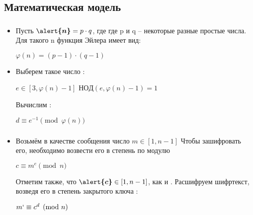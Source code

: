 \documentclass[t]{beamer}
\begin{document}
\subsection{Математическая модель}

\begin{frame}
	\frametitle{\insertsection}
	\framesubtitle{\insertsubsection}
    \begin{itemize}
        \item<1-> 
            Пусть $ \boldsymbol{\alert{n}} = p \cdot q $, где где p и q – некоторые разные простые числа. Для такого n функция Эйлера имеет вид: \newline 
            \begin{center} $\varphi(n) = (p - 1) \cdot (q - 1)$ \end{center}
            \vspace{3mm}
        \item<2-> 
            Выберем такое число : \newline 
            \begin{center}
               \hspace{10mm} $ e \in [3, \varphi(n) - 1]$ \newline 
                $НОД(e, \varphi(n) - 1) = 1$
            \end{center}
            Вычислим \alert{}:  \newline 
            \begin{center}
                \( d\equiv e^{-1} \pmod{\varphi(n)} \)
            \end{center}
    \end{itemize}
\end{frame}

\begin{frame}
    \frametitle{\insertsection}
	\framesubtitle{\insertsubsection}
	\begin{itemize}
	    \item<1-> Возьмём в качестве сообщения число $m \in [1, n-1]$ \newline 
	    Чтобы зашифровать его, необходимо возвести \newline его в степень  по модулю  \newline 
	    \begin{center}
	         \( c\equiv m^{e} \pmod{n} \)
	         \vspace{3mm}
	    \end{center}
	    Отметим также, что $\boldsymbol{\alert{c}} \in [1, n-1]$, как и . Расшифруем шифртекст, возведя его в степень закрытого ключа :
	    
	    \begin{center}
	    \vspace{3mm}
	        \( m` \equiv c^d \pmod{n} \)
	        \vspace{3mm}
	    \end{center}
	\end{itemize}
\end{frame}
\end{document}
